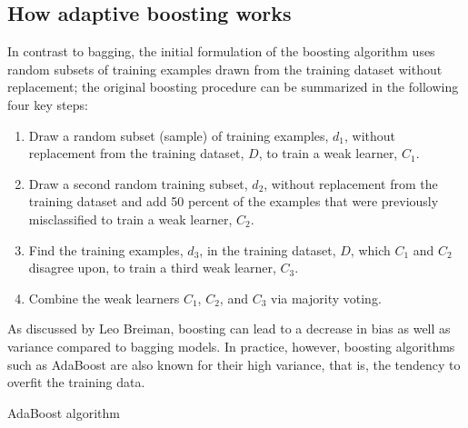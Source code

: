 \subsection{How adaptive boosting works}
In contrast to bagging, the initial formulation of the boosting algorithm uses random subsets of training examples drawn from the training dataset without replacement; the original boosting procedure can be summarized in the following four key steps:
\begin{enumerate}
    \item Draw a random subset (sample) of training examples, $d_1$, without replacement from the training dataset, $D$, to train a weak learner, $C_1$.
    \item Draw a second random training subset, $d_2$, without replacement from the training dataset and add 50 percent of the examples that were previously misclassified to train a weak learner, $C_2$.
    \item Find the training examples, $d_3$, in the training dataset, $D$, which $C_1$ and $C_2$ disagree upon, to train a third weak learner, $C_3$.
    \item Combine the weak learners $C_1$, $C_2$, and $C_3$ via majority voting.
\end{enumerate}

As discussed by Leo Breiman, boosting can lead to a decrease in bias as well as variance compared to bagging models. In practice, however, boosting algorithms such as AdaBoost are also known for their high variance, that is, the tendency to overfit the training data.


\begin{algorithm}
    \caption{AdaBoost algorithm}
\end{algorithm}
